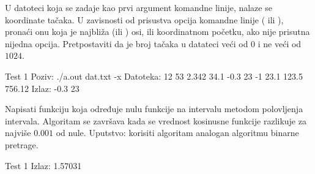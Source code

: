 \begin{Answer}[ref=404]
\end{Answer}
\begin{Exercise}[label=405]
  U datoteci koja se zadaje kao prvi argument komandne linije, nalaze
  se koordinate tačaka. U zavisnosti od prisustva opcija komandne
  linije ( ili ), pronaći onu koja je najbliža
   (ili ) osi, ili koordinatnom početku, ako nije
  prisutna nijedna opcija. Pretpostaviti da je broj tačaka u datateci
  veći od $0$ i ne veći od $1024$.
  
\begin{miditest}
\begin{test}{Test 1}
Poziv: ./a.out dat.txt -x
Datoteka:
  12 53
  2.342 34.1
  -0.3 23
  -1 23.1
  123.5 756.12
Izlaz: -0.3 23
\end{test}
\end{miditest}


\end{Exercise}

\begin{Answer}[ref=405]
\end{Answer}
\begin{Exercise}[label=406]
  Napisati funkciju koja određuje nulu funkcije  na
  intervalu \argf{[0,2]} metodom polovljenja intervala. Algoritam se
  završava kada se vrednost kosinusne funkcije razlikuje za najviše
  $0.001$ od nule. Uputstvo: korisiti algoritam analogan algoritmu
  binarne pretrage.
  
  
\begin{minitest}
\begin{test}{Test 1}
Izlaz: 1.57031
\end{test}
\end{minitest}


\end{Exercise}

